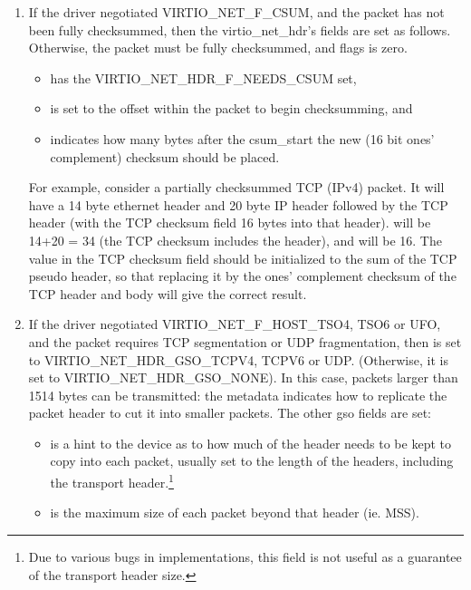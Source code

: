 \begin{enumerate}
\item If the driver negotiated VIRTIO_NET_F_CSUM, and the packet has
  not been fully checksummed, then the virtio_net_hdr's fields
  are set as follows. Otherwise, the packet must be fully
  checksummed, and flags is zero.
  \begin{itemize}
  \item {} has the VIRTIO_NET_HDR_F_NEEDS_CSUM set,

  \item {} is set to the offset within the packet to begin checksumming,
    and

  \item {} indicates how many bytes after the csum_start the
    new (16 bit ones' complement) checksum should be placed.
  \end{itemize}

For example, consider a partially checksummed TCP (IPv4) packet.
It will have a 14 byte ethernet header and 20 byte IP header
followed by the TCP header (with the TCP checksum field 16 bytes
into that header).  will be 14+20 = 34 (the TCP
checksum includes the header), and  will be 16. The
value in the TCP checksum field should be initialized to the sum
of the TCP pseudo header, so that replacing it by the ones'
complement checksum of the TCP header and body will give the
correct result.

\item If the driver negotiated
  VIRTIO_NET_F_HOST_TSO4, TSO6 or UFO, and the packet requires
  TCP segmentation or UDP fragmentation, then 
  is set to VIRTIO_NET_HDR_GSO_TCPV4, TCPV6 or UDP.
  (Otherwise, it is set to VIRTIO_NET_HDR_GSO_NONE). In this
  case, packets larger than 1514 bytes can be transmitted: the
  metadata indicates how to replicate the packet header to cut it
  into smaller packets. The other gso fields are set:

  \begin{itemize}
  \item {} is a hint to the device as to how much of the header
    needs to be kept to copy into each packet, usually set to the
    length of the headers, including the transport header.\footnote{Due to various bugs in implementations, this field is not useful
as a guarantee of the transport header size.
}

  \item {} is the maximum size of each packet beyond that
    header (ie. MSS).


\end{itemize}
\end{enumerate}
